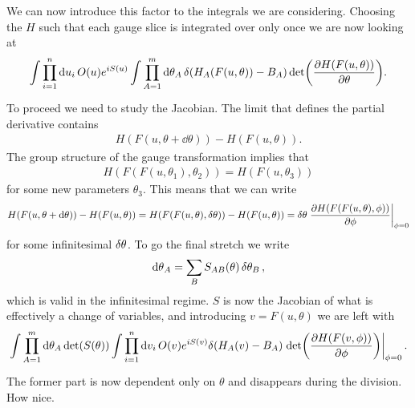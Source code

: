 We can now introduce this factor to the integrals we are considering. Choosing the $H$ such that each gauge slice is integrated over only once we are now looking at
\begin{align*}
\int\limits_{}^{}\prod\limits_{i = 1}^{n}\dd{u_{i}}O(u)e^{iS(u)}\int\limits_{}^{}\prod\limits_{A = 1}^{m}\dd{\theta_{A}}\delta(H_{A}(F(u, \theta)) - B_{A})\det(\pdv{H(F(u, \theta))}{\theta}).
\end{align*}
To proceed we need to study the Jacobian. The limit that defines the partial derivative contains
\begin{align*}
H(F(u, \theta + \dd{\theta})) - H(F(u, \theta)).
\end{align*}
The group structure of the gauge transformation implies that
\begin{align*}
H(F(F(u, \theta_{1}), \theta_{2})) = H(F(u, \theta_{3}))
\end{align*}
for some new parameters $\theta_{3}$. This means that we can write
\begin{align*}
H(F(u, \theta + \dd{\theta})) - H(F(u, \theta)) = H(F(F(u, \theta), \var{\theta})) - H(F(u, \theta)) = \var{\theta}\eval{\pdv{H(F(F(u, \theta), \phi))}{\phi}}_{\phi = 0}
\end{align*}
for some infinitesimal $\var{\theta}$. To go the final stretch we write
\begin{align*}
\dd{\theta}_{A} = \sum\limits_{B}S_{AB}(\theta)\var{\theta_{B}},
\end{align*}
which is valid in the infinitesimal regime. $S$ is now the Jacobian of what is effectively a change of variables, and introducing $v = F(u, \theta)$ we are left with
\begin{align*}
\inte{}{}\prod\limits_{A = 1}^{m}\dd{\theta_{A}}\det(S(\theta))\inte{}{}\prod\limits_{i = 1}^{n}\dd{v_{i}}O(v)e^{iS(v)}\delta(H_{A}(v) - B_{A})\eval{\det(\pdv{H(F(v, \phi))}{\phi})}_{\phi = 0}.
\end{align*}
The former part is now dependent only on $\theta$ and disappears during the division. How nice.


